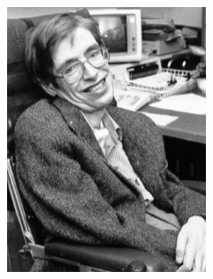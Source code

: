 \documentclass[crop=false]{standalone}
\begin{document}
\begin{figure}[H]
    \includegraphics[width=\linewidth]{images/stephen-hawking.jpg}
  \endminipage
  \vspace{1,25cm}
\end{figure}
\end{document}
